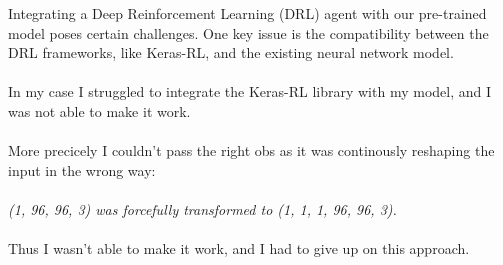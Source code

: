 \documentclass{article}
\begin{document}
Integrating a Deep Reinforcement Learning (DRL) agent with our pre-trained model poses certain challenges. One key issue is the compatibility between the DRL frameworks, like Keras-RL, and the existing neural network model.
\\
\\
In my case I struggled to integrate the Keras-RL library with my model, and I was not able to make it work.
\\
\\
More precicely I couldn't pass the right obs as it was continously reshaping the input in the wrong way:
\\
\\
\emph{(1, 96, 96, 3) was forcefully transformed to (1, 1, 1, 96, 96, 3).}
\\
\\
Thus I wasn't able to make it work, and I had to give up on this approach.
\end{document}

